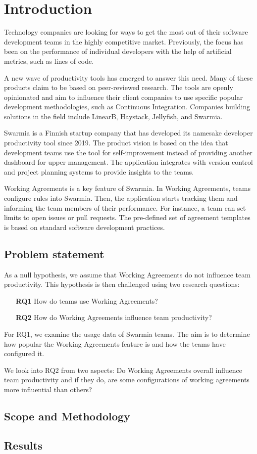 \chapter{Introduction}

Technology companies are looking for ways to get the most out of their software development teams in the highly competitive market. Previously, the focus has been on the performance of individual developers with the help of artificial metrics, such as lines of code. 

A new wave of productivity tools has emerged to answer this need. Many of these products claim to be based on peer-reviewed research. The tools are openly opinionated and aim to influence their client companies to use specific popular development methodologies, such as Continuous Integration. Companies building solutions in the field include LinearB, Haystack, Jellyfish, and Swarmia.

Swarmia is a Finnish startup company that has developed its namesake developer productivity tool since 2019. The product vision is based on the idea that development teams use the tool for self-improvement instead of providing another dashboard for upper management. The application integrates with version control and project planning systems to provide insights to the teams. 

Working Agreements is a key feature of Swarmia. In Working Agreements, teams configure rules into Swarmia. Then, the application starts tracking them and informing the team members of their performance. For instance, a team can set limits to open issues or pull requests. The pre-defined set of agreement templates is based on standard software development practices. 

\section{Problem statement}

As a null hypothesis, we assume that Working Agreements do not influence team productivity. This hypothesis is then challenged using two research questions: 

\begin{enumerate}
    \item[{\bf RQ1}] How do teams use Working Agreements?
    \item[{\bf RQ2}] How do Working Agreements influence team productivity?
\end{enumerate}

For RQ1, we examine the usage data of Swarmia teams. The aim is to determine how popular the Working Agreements feature is and how the teams have configured it. 

We look into RQ2 from two aspects: Do Working Agreements overall influence team productivity and if they do, are some configurations of working agreements more influential than others? 

\section{Scope and Methodology}



\section{Results}

